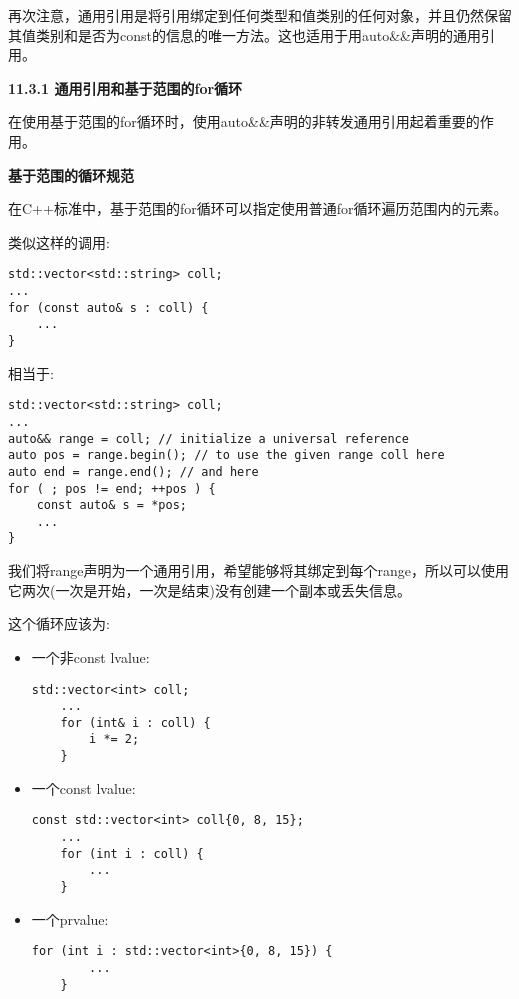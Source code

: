 再次注意，通用引用是将引用绑定到任何类型和值类别的任何对象，并且仍然保留其值类别和是否为const的信息的唯一方法。这也适用于用auto\&\&声明的通用引用。\par

\hspace*{\fill} \par %
\textbf{11.3.1 通用引用和基于范围的for循环}

在使用基于范围的for循环时，使用auto\&\&声明的非转发通用引用起着重要的作用。\par

\hspace*{\fill} \par %
\textbf{基于范围的循环规范}

在C++标准中，基于范围的for循环可以指定使用普通for循环遍历范围内的元素。\par

类似这样的调用:\par

\begin{lstlisting}[caption={}]
std::vector<std::string> coll;
...
for (const auto& s : coll) {
	...
}
\end{lstlisting}

相当于:\par

\begin{lstlisting}[caption={}]
std::vector<std::string> coll;
...
auto&& range = coll; // initialize a universal reference
auto pos = range.begin(); // to use the given range coll here
auto end = range.end(); // and here
for ( ; pos != end; ++pos ) {
	const auto& s = *pos;
	...
}
\end{lstlisting}

我们将range声明为一个通用引用，希望能够将其绑定到每个range，所以可以使用它两次(一次是开始，一次是结束)没有创建一个副本或丢失信息。\par

这个循环应该为:\par

\begin{itemize}
	\item 一个非const lvalue:
	\begin{lstlisting}[caption={}]
	std::vector<int> coll;
	...
	for (int& i : coll) {
		i *= 2;
	}
	\end{lstlisting}
	\item 一个const lvalue:
	\begin{lstlisting}[caption={}]
	const std::vector<int> coll{0, 8, 15};
	...
	for (int i : coll) {
		...
	}
	\end{lstlisting}
	\item 一个prvalue:
	\begin{lstlisting}[caption={}]
	for (int i : std::vector<int>{0, 8, 15}) {
		...
	}
	\end{lstlisting}
\end{itemize}

